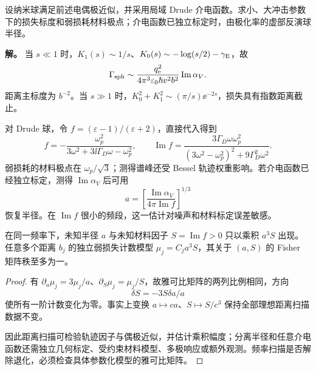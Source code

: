 \begin{workedexample}
设纳米球满足前述电偶极近似，并采用局域 Drude 介电函数。求小、大冲击参数下的损失标度和弱损耗材料极点；介电函数已独立标定时，由极化率的虚部反演球半径。

\textbf{解。} 当 $s\ll1$ 时，$K_1(s)\sim1/s$、$K_0(s)\sim-\log(s/2)-\gamma_{\rm E}$，故
\[
\Gamma_{\rm sph}\sim\frac{q_{\mathrm e}^2}{4\pi^3\varepsilon_0\hbar v^2b^2}
\operatorname{Im}\alpha_V.
\]
距离主标度为 $b^{-2}$。当 $s\gg1$ 时，$K_0^2+K_1^2\sim(\pi/s)\ee^{-2s}$，损失具有指数距离截止。

对 Drude 球，令 $f=(\varepsilon-1)/(\varepsilon+2)$，直接代入得到
\[
f=-\frac{\omega_p^2}{3\omega^2+3\ii\Gamma_D\omega-\omega_p^2},
\qquad
\operatorname{Im}f=
\frac{3\Gamma_D\omega\omega_p^2}
{(3\omega^2-\omega_p^2)^2+9\Gamma_D^2\omega^2}.
\]
弱损耗的材料极点在 $\omega_p/\sqrt3$；测得谱峰还受 Bessel 轨迹权重影响。若介电函数已经独立标定，测得 $\operatorname{Im}\alpha_V$ 后可用
\[
a=\left[\frac{\operatorname{Im}\alpha_V}{4\pi\operatorname{Im}f}\right]^{1/3}
\]
恢复半径。在 $\operatorname{Im}f$ 很小的频段，这一估计对噪声和材料标定误差敏感。
\end{workedexample}

\begin{proposition}
在同一频率下，未知半径 $a$ 与未知材料因子 $S=\operatorname{Im}f>0$ 只以乘积 $a^3S$ 出现。任意多个距离 $b_j$ 的独立弱损失计数模型 $\mu_j=C_j a^3S$，其关于 $(a,S)$ 的 Fisher 矩阵秩至多为一。
\end{proposition}
\begin{proof}
有 $\partial_a\mu_j=3\mu_j/a$、$\partial_S\mu_j=\mu_j/S$，故雅可比矩阵的两列比例相同，方向
\[
\delta S=-3S\delta a/a
\]
使所有一阶计数变化为零。事实上变换 $a\mapsto ca$、$S\mapsto S/c^3$ 保持全部理想距离扫描数据不变。

因此距离扫描可检验轨迹因子与偶极近似，并估计乘积幅度；分离半径和任意介电函数还需独立几何标定、受约束材料模型、多极响应或额外观测。频率扫描是否解除退化，必须检查具体参数化模型的雅可比矩阵。
\end{proof}
